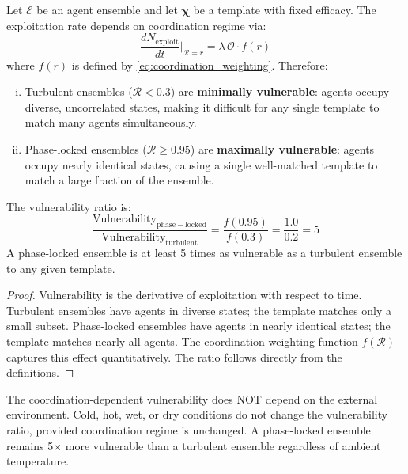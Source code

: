 \documentclass[11pt,twocolumn,a4paper]{article}
\newcommand{\Template}{\boldsymbol{\chi}}
\newcommand{\Coord}{\mathcal{R}}
\newcommand{\Overlap}{\mathcal{O}}
\begin{document}
\begin{theorem}
\label{thm:coord_vuln}
Let $\mathcal{E}$ be an agent ensemble and let $\Template$ be a template with fixed efficacy. The exploitation rate depends on coordination regime via:
\begin{equation}
\frac{dN_{\mathrm{exploit}}}{dt}\bigg|_{\Coord=r} = \lambda \, \Overlap \cdot f(r)
\label{eq:coord_depend}
\end{equation}
where $f(r)$ is defined by \cref{eq:coordination_weighting}. Therefore:
\begin{enumerate}[(i)]
\item Turbulent ensembles ($\Coord < 0.3$) are \textbf{minimally vulnerable}: agents occupy diverse, uncorrelated states, making it difficult for any single template to match many agents simultaneously.
\item Phase-locked ensembles ($\Coord \ge 0.95$) are \textbf{maximally vulnerable}: agents occupy nearly identical states, causing a single well-matched template to match a large fraction of the ensemble.
\end{enumerate}
The vulnerability ratio is:
\begin{equation}
\frac{\text{Vulnerability}_{\mathrm{phase-locked}}}{\text{Vulnerability}_{\mathrm{turbulent}}} = \frac{f(0.95)}{f(0.3)} = \frac{1.0}{0.2} = 5
\label{eq:vuln_ratio}
\end{equation}
A phase-locked ensemble is at least 5 times as vulnerable as a turbulent ensemble to any given template.
\end{theorem}

\begin{proof}
Vulnerability is the derivative of exploitation with respect to time. Turbulent ensembles have agents in diverse states; the template matches only a small subset. Phase-locked ensembles have agents in nearly identical states; the template matches nearly all agents. The coordination weighting function $f(\Coord)$ captures this effect quantitatively. The ratio follows directly from the definitions.
\end{proof}

\begin{remark}
The coordination-dependent vulnerability does NOT depend on the external environment. Cold, hot, wet, or dry conditions do not change the vulnerability ratio, provided coordination regime is unchanged. A phase-locked ensemble remains 5× more vulnerable than a turbulent ensemble regardless of ambient temperature.
\end{remark}
\end{document}
